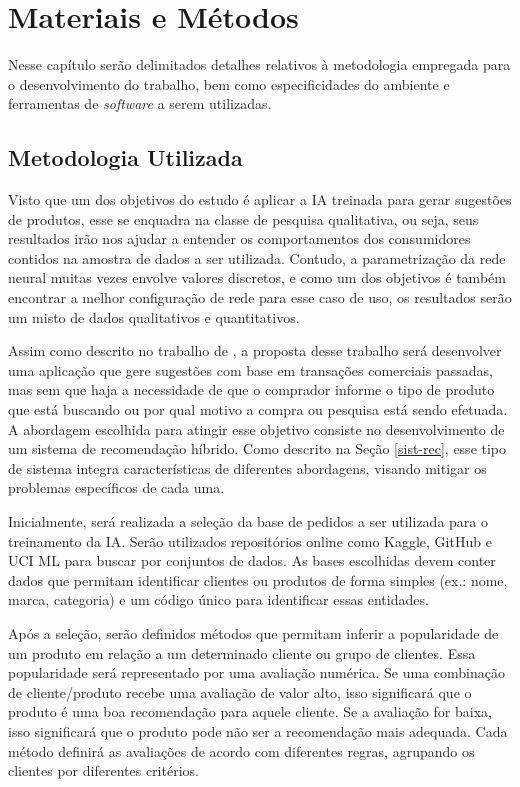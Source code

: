 \chapter{Materiais e Métodos} \label{mat-metodos}
\pagestyle{simple} 

Nesse capítulo serão delimitados detalhes relativos à metodologia empregada para o desenvolvimento do trabalho, bem como especificidades do ambiente e ferramentas de \textit{software} a serem utilizadas.

\section{Metodologia Utilizada} \label{metodologia}

Visto que um dos objetivos do estudo é aplicar a IA treinada para gerar sugestões de produtos, esse se enquadra na classe de pesquisa qualitativa, ou seja, seus resultados irão nos ajudar a entender os comportamentos dos consumidores contidos na amostra de dados a ser utilizada. Contudo, a parametrização da rede neural muitas vezes envolve valores discretos, e como um dos objetivos é também encontrar a melhor configuração de rede para esse caso de uso, os resultados serão um misto de dados qualitativos e quantitativos.

Assim como descrito no trabalho de , a proposta desse trabalho será desenvolver uma aplicação que gere sugestões com base em transações comerciais passadas, mas sem que haja a necessidade de que o comprador informe o tipo de produto que está buscando ou por qual motivo a compra ou pesquisa está sendo efetuada. A abordagem escolhida para atingir esse objetivo consiste no desenvolvimento de um sistema de recomendação híbrido. Como descrito na Seção \ref{sist-rec}, esse tipo de sistema integra características de diferentes abordagens, visando mitigar os problemas específicos de cada uma.

Inicialmente, será realizada a seleção da base de pedidos a ser utilizada para o treinamento da IA. Serão utilizados repositórios online como Kaggle, GitHub e UCI ML para buscar por conjuntos de dados. As bases escolhidas devem conter dados que permitam identificar clientes ou produtos de forma simples (ex.: nome, marca, categoria) e um código único para identificar essas entidades.

Após a seleção, serão definidos métodos que permitam inferir a popularidade de um produto em relação a um determinado cliente ou grupo de clientes. Essa popularidade será representado por uma avaliação numérica. Se uma combinação de cliente/produto recebe uma avaliação de valor alto, isso significará que o produto é uma boa recomendação para aquele cliente. Se a avaliação for baixa, isso significará que o produto pode não ser a recomendação mais adequada. Cada método definirá as avaliações de acordo com diferentes regras, agrupando os clientes por diferentes critérios.

